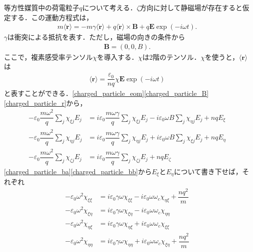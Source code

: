 等方性媒質中の荷電粒子$q$について考える．$\zeta$方向に対して静磁場が存在すると仮定する．この運動方程式は，
\begin{align}
  m\langle\ddot{\boldsymbol{r}}\rangle =  - m\gamma\langle\dot{\boldsymbol{r}}\rangle+q\langle\dot{\boldsymbol{r}}\rangle\times\boldsymbol{B}+q\boldsymbol{E}\exp( - i\omega t).
  \label{charged_particle_eom}
\end{align}
$\gamma$は衝突による抵抗を表す．ただし，磁場の向きの条件から
\begin{align}
  \boldsymbol{B} = (0, 0, B). \label{charged_particle_B}
\end{align}
ここで，複素感受率テンソル$\chi$を導入する．$\chi$は2階のテンソル．$\chi$を使うと，$\langle\boldsymbol{r}\rangle$は
\begin{align}
  \langle\boldsymbol{r}\rangle = \dfrac{\varepsilon_0}{nq}\chi\boldsymbol{E}\exp( - i\omega t)
  \label{charged_particle_r}
\end{align}
と表すことができる．\eqref{charged_particle_eom}\eqref{charged_particle_B}\eqref{charged_particle_r}から，
\begin{align}
  - \varepsilon_0\dfrac{m\omega^2}{q}\sum_{{j}}\chi_{\xi{j}}E_{{j}} &= i\varepsilon_0\dfrac{m\omega\gamma}{q}\sum_{{j}}\chi_{\xi{j}}E_{{j}} - i\varepsilon_0\omega B\sum_{{j}}\chi_{\eta{j}}E_{{j}}+nqE_\xi
  \label{charged_particle_ba} \\
  - \varepsilon_0\dfrac{m\omega^2}{q}\sum_{{j}}\chi_{\eta{j}}E_{{j}} &= i\varepsilon_0\dfrac{m\omega\gamma}{q}\sum_{{j}}\chi_{\eta{j}}E_{{j}}+i\varepsilon_0\omega B\sum_{{j}}\chi_{\xi{j}}E_{{j}}+nqE_\eta
  \label{charged_particle_bb} \\
  - \varepsilon_0\dfrac{m\omega^2}{q}\sum_{{j}}\chi_{\zeta{j}}E_{{j}} &= i\varepsilon_0\dfrac{m\omega\gamma}{q}\sum_{{j}}\chi_{\zeta{j}}E_{{j}}+nqE_\zeta
  \label{charged_particle_bc}
\end{align}
\eqref{charged_particle_ba}\eqref{charged_particle_bb}から$E_\xi$と$E_\eta$について書き下せば，それぞれ
\begin{align}
  - \varepsilon_0\omega^2\chi_{\xi\xi} &= i\varepsilon_0\gamma\omega\chi_{\xi\xi} - i\varepsilon_0\omega\omega_c\chi_{\eta\xi}+\dfrac{nq^2}{m} \label{charged_particle_a} \\
  - \varepsilon_0\omega^2\chi_{\xi\eta} &= i\varepsilon_0\gamma\omega\chi_{\xi\eta} - i\varepsilon_0\omega\omega_c\chi_{\eta\eta} \label{charged_particle_b} \\
  - \varepsilon_0\omega^2\chi_{\eta\xi} &= i\varepsilon_0\gamma\omega\chi_{\eta\xi}+i\varepsilon_0\omega\omega_c\chi_{\xi\xi} \label{charged_particle_c} \\
  - \varepsilon_0\omega^2\chi_{\eta\eta} &= i\varepsilon_0\gamma\omega\chi_{\eta\eta}+i\varepsilon_0\omega\omega_c\chi_{\xi\eta}+\dfrac{nq^2}{m} \label{charged_particle_d}
\end{align}
